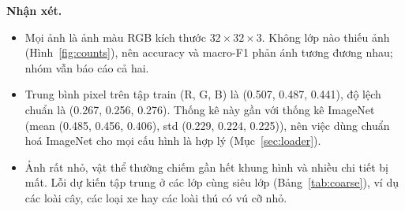 \documentclass[12pt]{article}
\begin{document}
\textbf{Nhận xét.}
\begin{itemize}
  \item Mọi ảnh là ảnh màu RGB kích thước $32\times32\times3$. Không lớp nào thiếu ảnh (Hình~\ref{fig:counts}),
        nên accuracy và macro-F1 phản ánh tương đương nhau; nhóm vẫn báo cáo cả hai.
  \item Trung bình pixel trên tập train (R, G, B) là (0.507, 0.487, 0.441), độ lệch chuẩn là (0.267, 0.256, 0.276).
        Thống kê này gần với thống kê ImageNet (mean (0.485, 0.456, 0.406), std (0.229, 0.224, 0.225)), nên việc dùng
        chuẩn hoá ImageNet cho mọi cấu hình là hợp lý (Mục~\ref{sec:loader}).
  \item Ảnh rất nhỏ, vật thể thường chiếm gần hết khung hình và nhiều chi tiết bị mất. Lỗi dự kiến tập trung ở các
        lớp cùng siêu lớp (Bảng~\ref{tab:coarse}), ví dụ các loài cây, các loại xe hay các loài thú có vú cỡ nhỏ.
\end{itemize}
\end{document}
